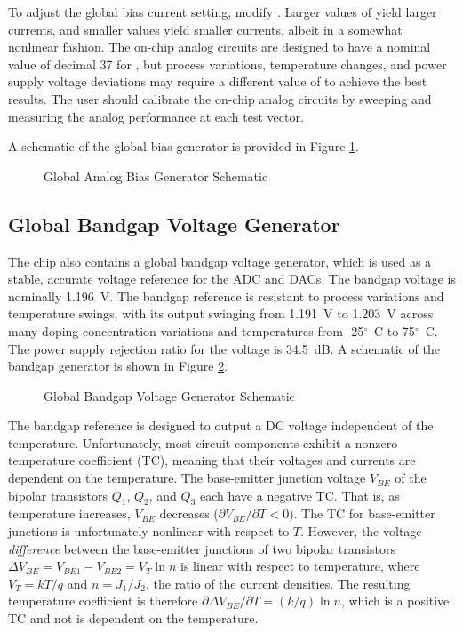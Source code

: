 To adjust the global bias current setting, modify . Larger values of  yield larger currents, and smaller values yield smaller currents, albeit in a somewhat nonlinear fashion. The on-chip analog circuits are designed to have a nominal value of decimal 37 for , but process variations, temperature changes, and power supply voltage deviations may require a different value of  to achieve the best results. The user should calibrate the on-chip analog circuits by sweeping  and measuring the analog performance at each test vector.

A schematic of the global bias generator is provided in Figure \ref{fig:bias-gen}.

\begin{figure}[htpb]
	
	\caption{Global Analog Bias Generator Schematic}
	\label{fig:bias-gen}
\end{figure}


\subsection{Global Bandgap Voltage Generator}

The chip also contains a global bandgap voltage generator, which is used as a stable, accurate voltage reference for the ADC and DACs. The bandgap voltage is nominally 1.196~V. The bandgap reference is resistant to process variations and temperature swings, with its output swinging from 1.191~V to 1.203~V across many doping concentration variations and temperatures from -25$^\circ$~C to 75$^\circ$~C. The power supply rejection ratio for the voltage is 34.5~dB. A schematic of the bandgap generator is shown in Figure \ref{fig:bandgap}.

\begin{figure}[htpb]
	
	\caption{Global Bandgap Voltage Generator Schematic}
	\label{fig:bandgap}
\end{figure}

The bandgap reference is designed to output a DC voltage independent of the temperature. Unfortunately, most circuit components exhibit a nonzero temperature coefficient (TC), meaning that their voltages and currents are dependent on the temperature. The base-emitter junction voltage $V_{BE}$ of the bipolar transistors $Q_1$, $Q_2$, and $Q_3$ each have a negative TC. That is, as temperature increases, $V_{BE}$ decreases ($\partial V_{BE} / \partial T < 0$). The TC for base-emitter junctions is unfortunately nonlinear with respect to $T$. However, the voltage \textit{difference} between the base-emitter junctions of two bipolar transistors $\Delta V_{BE} = V_{BE1} - V_{BE2} = V_T \ln n$ is linear with respect to temperature, where $V_T = kT/q$ and $n = J_1/J_2$, the ratio of the current densities. The resulting temperature coefficient is therefore $\partial \Delta V_{BE} / \partial T = (k/q) \ln n$, which is a positive TC and not is dependent on the temperature.

